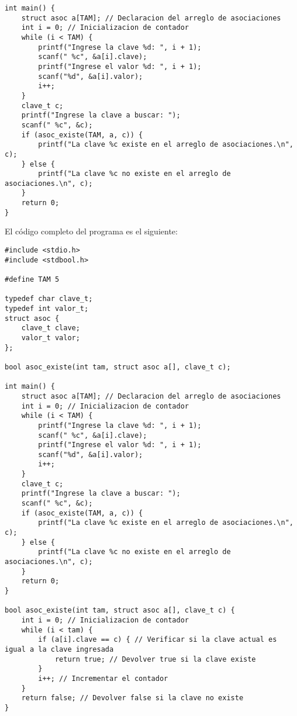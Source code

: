 \documentclass{article}
\begin{document}
\begin{verbatim}
int main() {
    struct asoc a[TAM]; // Declaracion del arreglo de asociaciones
    int i = 0; // Inicializacion de contador
    while (i < TAM) {
        printf("Ingrese la clave %d: ", i + 1);
        scanf(" %c", &a[i].clave);
        printf("Ingrese el valor %d: ", i + 1);
        scanf("%d", &a[i].valor);
        i++;
    }
    clave_t c;
    printf("Ingrese la clave a buscar: ");
    scanf(" %c", &c);
    if (asoc_existe(TAM, a, c)) {
        printf("La clave %c existe en el arreglo de asociaciones.\n", c);
    } else {
        printf("La clave %c no existe en el arreglo de asociaciones.\n", c);
    }
    return 0;
}
\end{verbatim}
\newpage
El código completo del programa es el siguiente:
\begin{verbatim}
#include <stdio.h>
#include <stdbool.h>

#define TAM 5

typedef char clave_t;
typedef int valor_t;
struct asoc {
    clave_t clave;
    valor_t valor;
};

bool asoc_existe(int tam, struct asoc a[], clave_t c);

int main() {
    struct asoc a[TAM]; // Declaracion del arreglo de asociaciones
    int i = 0; // Inicializacion de contador
    while (i < TAM) {
        printf("Ingrese la clave %d: ", i + 1);
        scanf(" %c", &a[i].clave);
        printf("Ingrese el valor %d: ", i + 1);
        scanf("%d", &a[i].valor);
        i++;
    }
    clave_t c;
    printf("Ingrese la clave a buscar: ");
    scanf(" %c", &c);
    if (asoc_existe(TAM, a, c)) {
        printf("La clave %c existe en el arreglo de asociaciones.\n", c);
    } else {
        printf("La clave %c no existe en el arreglo de asociaciones.\n", c);
    }
    return 0;
}

bool asoc_existe(int tam, struct asoc a[], clave_t c) {
    int i = 0; // Inicializacion de contador
    while (i < tam) {
        if (a[i].clave == c) { // Verificar si la clave actual es igual a la clave ingresada
            return true; // Devolver true si la clave existe
        }
        i++; // Incrementar el contador
    }
    return false; // Devolver false si la clave no existe
}

\end{verbatim}
\end{document}
